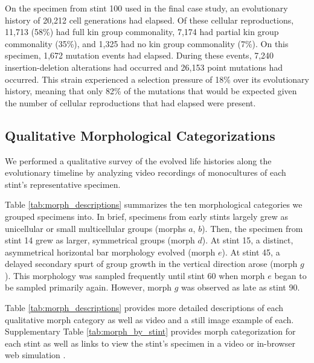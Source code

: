 On the specimen from stint 100 used in the final case study, an evolutionary history of 20,212 cell generations had elapsed.
Of these cellular reproductions, 11,713 (58\%) had full kin group commonality, 7,174 had partial kin group commonality (35\%), and 1,325 had no kin group commonality (7\%).
On this specimen, 1,672 mutation events had elapsed.
During these events, 7,240 insertion-deletion alterations had occurred and 26,153 point mutations had occurred.
This strain experienced a selection pressure of 18\% over its evolutionary history, meaning that only 82\% of the mutations that would be expected given the number of cellular reproductions that had elapsed were present.

\subsection{Qualitative Morphological Categorizations}



We performed a qualitative survey of the evolved life histories along the evolutionary timeline by analyzing video recordings of monocultures of each stint's representative specimen.

Table \ref{tab:morph_descriptions} summarizes the ten morphological categories we grouped specimens into.
In brief, specimens from early stints largely grew as unicellular or small multicellular groups (morphs $a$, $b$).
Then, the specimen from stint 14 grew as larger, symmetrical groups (morph $d$).
At stint 15, a distinct, asymmetrical horizontal bar morphology evolved (morph $e$).
At stint 45, a delayed secondary spurt of group growth in the vertical direction arose (morph $g$).
This morphology was sampled frequently until stint 60 when morph $e$ began to be sampled primarily again.
However, morph $g$ was observed as late as stint 90.

Table \ref{tab:morph_descriptions} provides more detailed descriptions of each qualitative morph category as well as video and a still image example of each.
Supplementary Table \ref{tab:morph_by_stint} provides morph categorization for each stint as well as links to view the stint's specimen in a video or in-browser web simulation \citep{Moreno_2021}.

